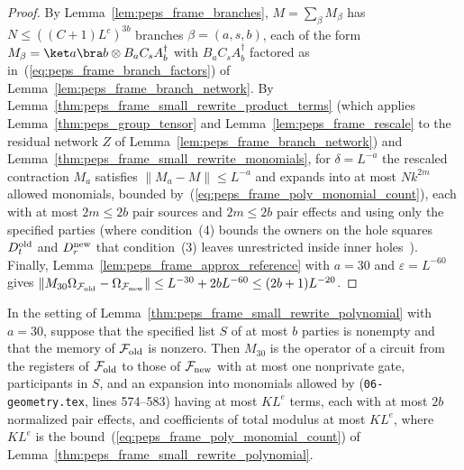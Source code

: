 \begin{proof}\leanok
    By Lemma~\ref{lem:peps_frame_branches}, $M=\sum_\beta M_\beta$ has $N\le((C+1)L^c)^{3b}$ branches $\beta=(a,s,b)$, each of the form $M_\beta=\ket a\bra b\otimes B_aC_sA_b^\dagger$ with $B_aC_sA_b^\dagger$ factored as in~(\ref{eq:peps_frame_branch_factors}) of Lemma~\ref{lem:peps_frame_branch_network}. By Lemma~\ref{thm:peps_frame_small_rewrite_product_terms} (which applies Lemma~\ref{thm:peps_group_tensor} and Lemma~\ref{lem:peps_frame_rescale} to the residual network $Z$ of Lemma~\ref{lem:peps_frame_branch_network}) and Lemma~\ref{thm:peps_frame_small_rewrite_monomials}, for $\delta=L^{-a}$ the rescaled contraction $M_a$ satisfies $\lVert M_a-M\rVert\le L^{-a}$ and expands into at most $Nk^{2m}$ allowed monomials, bounded by~(\ref{eq:peps_frame_poly_monomial_count}), each with at most $2m\le 2b$ pair sources and $2m\le 2b$ pair effects and using only the specified parties (where condition~(4) bounds the owners on the hole squares $D^{\rm old}_t$ and $D^{\rm new}_r$ that condition~(3) leaves unrestricted inside inner holes~\cite{gap:polypeps_small_rewrite_monomials}). Finally, Lemma~\ref{lem:peps_frame_approx_reference} with $a=30$ and $\varepsilon=L^{-60}$ gives $\lVert M_{30}\Omega_{\mathcal F_{\rm old}}-\Omega_{\mathcal F_{\rm new}}\rVert\le L^{-30}+2bL^{-60}\le(2b+1)L^{-20}$.
\end{proof}

\begin{lemma}
    \label{thm:peps_frame_small_rewrite_gate}
    \leanok
    In the setting of Lemma~\ref{thm:peps_frame_small_rewrite_polynomial}
    with $a=30$, suppose that the specified list $S$ of at most $b$ parties is nonempty and
    that the memory of $\mathcal F_{\rm old}$ is nonzero.
    Then $M_{30}$ is the operator of a circuit from the
    registers of $\mathcal F_{\rm old}$ to those of $\mathcal F_{\rm new}$
    with at most one nonprivate gate, participants in $S$, and an
    expansion into monomials allowed by
    \cite[Theorem~5.2]{OpenAI2026PolynomialPEPS} (\texttt{06-geometry.tex}, lines 574--583) having at most
    $K L^e$ terms, each with at most $2b$ normalized pair effects, and
    coefficients of total modulus at most $K L^e$, where $K L^e$ is the bound~(\ref{eq:peps_frame_poly_monomial_count}) of
    Lemma~\ref{thm:peps_frame_small_rewrite_polynomial}.
\end{lemma}


